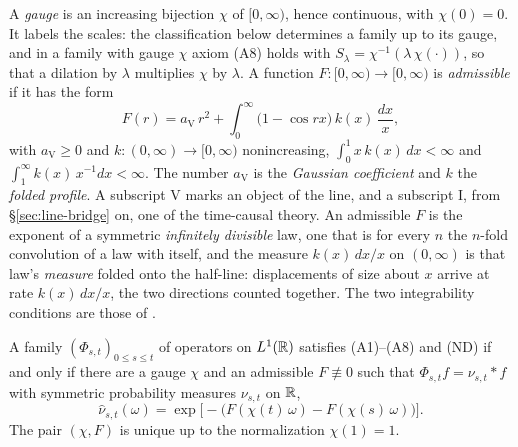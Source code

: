 
A \emph{gauge} is an increasing bijection $\chi$ of $[0,\infty)$, hence continuous, with
$\chi(0) = 0$. It labels the scales: the classification below determines a family up to its
gauge, and in a family with gauge $\chi$ axiom (A8) holds with
$S_\lambda = \chi^{-1}(\lambda\,\chi(\cdot))$, so that a dilation by $\lambda$ multiplies
$\chi$ by $\lambda$. A
function
$F : [0,\infty) \to [0,\infty)$ is \emph{admissible} if it has the form 
\begin{equation}\label{eq:admissible-line}
  F(r) = a_{\mathrm V}\,r^2 + \int_0^\infty \bigl(1 - \cos rx\bigr)\,k(x)\,\frac{dx}{x},
\end{equation}
with $a_{\mathrm V} \ge 0$ and $k : (0,\infty) \to [0,\infty)$ nonincreasing,
$\int_0^1 x\,k(x)\,dx < \infty$ and $\int_1^\infty k(x)\,x^{-1}dx < \infty$. The number
$a_{\mathrm V}$ is the \emph{Gaussian coefficient} and $k$ the \emph{folded profile}. A
subscript $\mathrm V$ marks an object of the line, and a subscript $\mathrm I$, from
\S\ref{sec:line-bridge} on, one of the time-causal theory. An admissible
$F$ is the exponent of a symmetric \emph{infinitely divisible} law, one that is for every $n$ the
$n$-fold convolution of a law with itself, and the measure $k(x)\,dx/x$ on $(0,\infty)$ is that
law's \emph{\Levy{} measure} folded onto the half-line: displacements of size about $x$ arrive at
rate $k(x)\,dx/x$, the two directions counted together. The two integrability conditions are
those of .

\begin{theorem}\label{thm:line-classification}
A family $(\Phi_{s,t})_{0 \le s \le t}$ of operators on $L^1(\mathbb{R})$ satisfies (A1)--(A8) and (ND)
if and only if there are a gauge $\chi$ and an admissible $F \not\equiv 0$ such that
$\Phi_{s,t}f = \nu_{s,t} * f$ with symmetric probability measures $\nu_{s,t}$ on $\mathbb{R}$,
\[
  \widehat\nu_{s,t}(\omega) = \exp\bigl[-\bigl(F(\chi(t)\,\omega) - F(\chi(s)\,\omega)\bigr)\bigr] .
\]
The pair $(\chi, F)$ is unique up to the normalization $\chi(1) = 1$.
\end{theorem}

